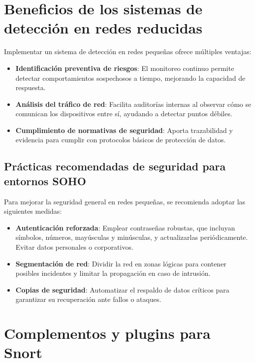\documentclass[11pt,a4paper,twoside]{report}
\begin{document}
\section{Beneficios de los sistemas de detección en redes reducidas}

Implementar un sistema de detección en redes pequeñas ofrece múltiples ventajas:

\begin{itemize}
	\item \textbf{Identificación preventiva de riesgos}: El monitoreo continuo permite detectar comportamientos sospechosos a tiempo, mejorando la capacidad de respuesta.
	\item \textbf{Análisis del tráfico de red}: Facilita auditorías internas al observar cómo se comunican los dispositivos entre sí, ayudando a detectar puntos débiles.
	\item \textbf{Cumplimiento de normativas de seguridad}: Aporta trazabilidad y evidencia para cumplir con protocolos básicos de protección de datos.
\end{itemize}

\vspace{0.5cm}

\subsection{Prácticas recomendadas de seguridad para entornos SOHO}

Para mejorar la seguridad general en redes pequeñas, se recomienda adoptar las siguientes medidas:

\begin{itemize}
	\item \textbf{Autenticación reforzada}: Emplear contraseñas robustas, que incluyan símbolos, números, mayúsculas y minúsculas, y actualizarlas periódicamente. Evitar datos personales o corporativos.
	\item \textbf{Segmentación de red}: Dividir la red en zonas lógicas para contener posibles incidentes y limitar la propagación en caso de intrusión.
	\item \textbf{Copias de seguridad}: Automatizar el respaldo de datos críticos para garantizar su recuperación ante fallos o ataques.
\end{itemize}



\pagebreak

\section{Complementos y plugins para Snort}
\end{document}
